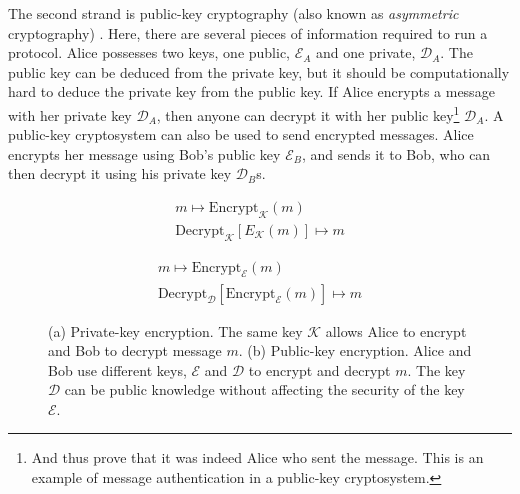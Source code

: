 The second strand is public-key cryptography (also known as \emph{asymmetric} cryptography) \cite{Diffie1976}. Here, there are several pieces of information required to run a protocol. %
Alice possesses two keys, one public, $\mathcal{E}_A$ and one private, $\mathcal{D}_A$. The public key can be deduced from the private key, but it should be computationally hard to deduce the private key from the public key. If Alice encrypts a message with her private key $\mathcal{D}_A$, then anyone can decrypt it with her public key\footnote{And thus prove that it was indeed Alice who sent the message. This is an example of message authentication in a public-key cryptosystem.} $\mathcal{D}_A$. A public-key cryptosystem can also be used to send encrypted messages. Alice encrypts her message using Bob's public key $\mathcal{E}_B$, and sends it to Bob, who can then decrypt it using his private key $\mathcal{D}_B$s.

\begin{figure}[htp]
\centering
\captionsetup{width=0.8\linewidth}
\begin{framed}
\begin{subfigure}{0.4\textwidth}
\begin{align*}
m \mapsto \text{Encrypt}_\mathcal{K}\left(m\right) \\
\text{Decrypt}_\mathcal{K}\left[E_\mathcal{K}\left(m\right)\right] \mapsto m
\end{align*}
\caption{}
\end{subfigure}
\begin{subfigure}{0.4\textwidth}
\begin{align*}
m \mapsto \text{Encrypt}_\mathcal{E}\left(m\right) \\
\text{Decrypt}_\mathcal{D}\left[\text{Encrypt}_\mathcal{E}\left(m\right)\right] \mapsto m
\end{align*}
\caption{}
\end{subfigure}
\caption{(a) Private-key encryption. The same key $\mathcal{K}$ allows Alice to encrypt and Bob to decrypt message $m$. (b) Public-key encryption. Alice and Bob use different keys, $\mathcal{E}$ and $\mathcal{D}$ to encrypt and decrypt $m$. The key $\mathcal{D}$ can be public knowledge without affecting the security of the key $\mathcal{E}$.}
\label{fig:pubpriv}
\end{framed}
\end{figure}

